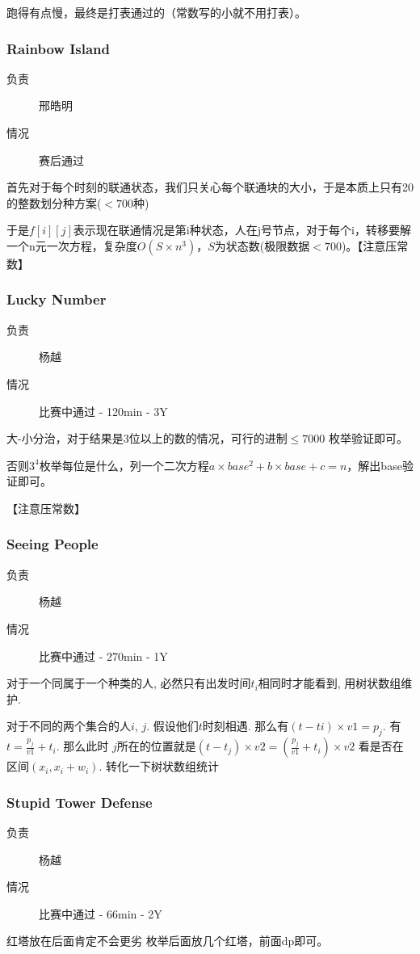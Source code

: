 \documentclass[a4paper, 11pt, nofonts, nocap, fancyhdr]{ctexart}
\newcommand{\problem}[1]{\subsubsection{#1}}
\begin{document}
跑得有点慢，最终是打表通过的（常数写的小就不用打表）。

\problem{Rainbow Island}

\begin{description}
\item[负责] 邢皓明
\item[情况] 赛后通过
\end{description}

首先对于每个时刻的联通状态，我们只关心每个联通块的大小，于是本质上只有20的整数划分种方案($<700$种)

于是$f[i][j]$表示现在联通情况是第i种状态，人在j号节点，对于每个i，转移要解一个n元一次方程，复杂度$O(S \times n^3)$，$S$为状态数(极限数据$<700$)。【注意压常数】

\problem{Lucky Number}

\begin{description}
\item[负责] 杨越
\item[情况] 比赛中通过 - 120min - 3Y
\end{description}

大-小分治，对于结果是3位以上的数的情况，可行的进制$\leq 7000$ 枚举验证即可。

否则$3^4$枚举每位是什么，列一个二次方程$a\times base^2+b\times base+c=n$，解出base验证即可。

【注意压常数】

\problem{Seeing People}

\begin{description}
\item[负责] 杨越
\item[情况] 比赛中通过 - 270min - 1Y
\end{description}

对于一个同属于一个种类的人, 必然只有出发时间$t_i$相同时才能看到, 用树状数组维护.

对于不同的两个集合的人$i$, $j$. 假设他们$t$时刻相遇. 那么有$(t-ti)\times v1 = p_j$. 有$t = \frac{p_j}{v1}+t_i$. 那么此时
$j$所在的位置就是$(t-t_j)\times v2 = (\frac{p_j}{v1}+t_i)\times v2$ 看是否在区间$(x_i, x_i+w_i)$. 转化一下树状数组统计 

\problem{Stupid Tower Defense}

\begin{description}
\item[负责] 杨越
\item[情况] 比赛中通过 - 66min - 2Y
\end{description}

红塔放在后面肯定不会更劣
枚举后面放几个红塔，前面dp即可。
\end{document}
